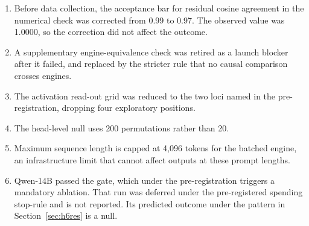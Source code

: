 \begin{enumerate}
  \item Before data collection, the acceptance bar for residual cosine agreement in the
        numerical check was corrected from 0.99 to 0.97. The observed value was 1.0000, so
        the correction did not affect the outcome.
  \item A supplementary engine-equivalence check was retired as a launch blocker after it
        failed, and replaced by the stricter rule that no causal comparison crosses engines.
  \item The activation read-out grid was reduced to the two loci named in the
        pre-registration, dropping four exploratory positions.
  \item The head-level null uses 200 permutations rather than 20.
  \item Maximum sequence length is capped at 4{,}096 tokens for the batched engine, an
        infrastructure limit that cannot affect outputs at these prompt lengths.
  \item Qwen-14B passed the gate, which under the pre-registration triggers a mandatory
        ablation. That run was deferred under the pre-registered spending stop-rule and is not reported. Its
        predicted outcome under the pattern in Section~\ref{sec:h6res} is a null.
\end{enumerate}
